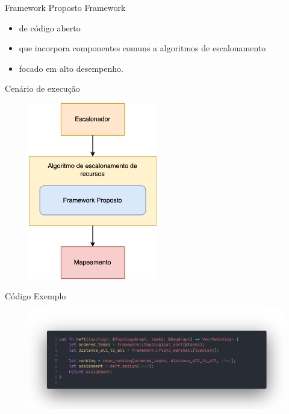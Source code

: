 \begin{frame}{Framework Proposto}
    Framework
    \begin{itemize}
        \item[] de código aberto
        \item[] que incorpora componentes comuns a algoritmos de escalonamento
        \item[] focado em alto desempenho.
    \end{itemize}
\end{frame}

\begin{frame}{Cenário de execução}
    \begin{figure}
        \centering
        \includegraphics[width=0.5\textwidth]{Figuras/framework_usage.png}
    \end{figure}
\end{frame}

\begin{frame}{Código Exemplo}
    \begin{figure}
        \centering
        \includegraphics[width=\textwidth]{Figuras/code.png}
    \end{figure}
\end{frame}

